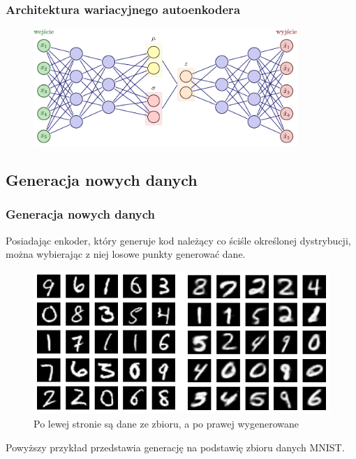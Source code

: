 \documentclass{beamer}
\begin{document}
	\begin{frame}
		\frametitle{Architektura wariacyjnego autoenkodera}
		\begin{figure}
			\centering\includegraphics[width=10cm]{tikzvae.pdf}
		\end{figure}
	\end{frame}

	\begin{frame}
		\subsection{Generacja nowych danych}
		\frametitle{Generacja nowych danych}
		Posiadając enkoder, który generuje kod należący co ściśle określonej dystrybucji, można wybierając z niej losowe punkty generować dane. 
		
		\begin{figure}
			\centering\includegraphics{vaegeneracja.png} 
			\caption{Po lewej stronie są dane ze zbioru, a po prawej wygenerowane}
		\end{figure}
	
	Powyższy przykład przedstawia generację na podstawię zbioru danych MNIST.
		
	\end{frame}
\end{document}
